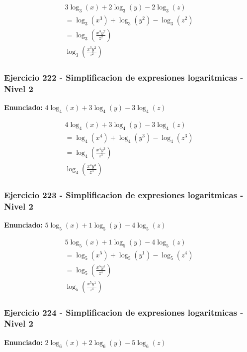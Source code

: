 \documentclass[12pt,a4paper]{article}
\begin{document}
\[
\begin{aligned}
3\log_{3}\left(x\right)+2\log_{3}\left(y\right)-2\log_{3}\left(z\right)\\
=\log_{3}\left(x^{3}\right)+\log_{3}\left(y^{2}\right)-\log_{3}\left(z^{2}\right)\\
=\log_{3}\left(\frac{x^{3}y^{2}}{z^{2}}\right)\\
\boxed{\log_{3}\left(\frac{x^{3}y^{2}}{z^{2}}\right)}
\end{aligned}
\]


\subsubsection*{Ejercicio 222 - Simplificacion de expresiones logaritmicas - Nivel 2}
\textbf{Enunciado:} \(4\log_{4}\left(x\right)+3\log_{4}\left(y\right)-3\log_{4}\left(z\right)\)

\[
\begin{aligned}
4\log_{4}\left(x\right)+3\log_{4}\left(y\right)-3\log_{4}\left(z\right)\\
=\log_{4}\left(x^{4}\right)+\log_{4}\left(y^{3}\right)-\log_{4}\left(z^{3}\right)\\
=\log_{4}\left(\frac{x^{4}y^{3}}{z^{3}}\right)\\
\boxed{\log_{4}\left(\frac{x^{4}y^{3}}{z^{3}}\right)}
\end{aligned}
\]


\subsubsection*{Ejercicio 223 - Simplificacion de expresiones logaritmicas - Nivel 2}
\textbf{Enunciado:} \(5\log_{5}\left(x\right)+1\log_{5}\left(y\right)-4\log_{5}\left(z\right)\)

\[
\begin{aligned}
5\log_{5}\left(x\right)+1\log_{5}\left(y\right)-4\log_{5}\left(z\right)\\
=\log_{5}\left(x^{5}\right)+\log_{5}\left(y^{1}\right)-\log_{5}\left(z^{4}\right)\\
=\log_{5}\left(\frac{x^{5}y^{1}}{z^{4}}\right)\\
\boxed{\log_{5}\left(\frac{x^{5}y^{1}}{z^{4}}\right)}
\end{aligned}
\]


\subsubsection*{Ejercicio 224 - Simplificacion de expresiones logaritmicas - Nivel 2}
\textbf{Enunciado:} \(2\log_{6}\left(x\right)+2\log_{6}\left(y\right)-5\log_{6}\left(z\right)\)
\end{document}
